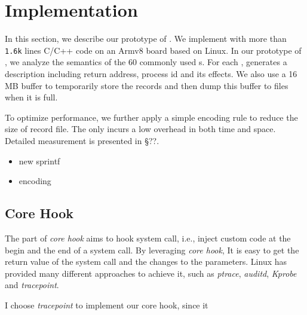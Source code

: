 \section{Implementation}

In this section, we describe our prototype of \TheName. We implement \TheName
with more than \texttt{1.6k} lines C/C++ code
on an Armv8 board based on Linux. In our prototype of \TheName, we analyze the semantics of the 60 commonly used
\syscall{}s. For each \syscall{}, \TheName generates a description including  return address, process id and its effects. We also use a 16 MB buffer to temporarily store
the \syscall{} records and then dump this buffer to files when it is full. 

To optimize performance, we further apply a simple encoding rule to reduce the size of record file. The \TheName only incurs a low overhead in both time and space. Detailed measurement is presented
in \S ??.

\begin{itemize}
    \item new sprintf
    \item encoding
\end{itemize}

\subsection{Core Hook}


The part of \textit{core hook} aims to hook system call, i.e., inject custom code at the begin and the end of a system call. By leveraging \textit{core hook}, It is easy to get the return value of the system call and the changes to the parameters. Linux has provided many different approaches to achieve it, such as \textit{ptrace}, \textit{auditd}, \textit{Kprobe} and \textit{tracepoint}. 

I choose \textit{tracepoint} to implement our core hook, since it 




